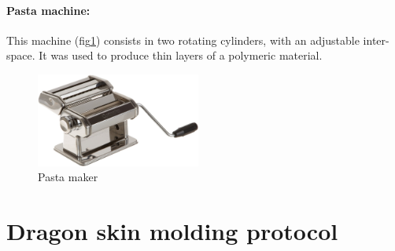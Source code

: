 \paragraph{Pasta machine:}
This machine (fig\ref{fig:pasta_maker}) consists in two rotating cylinders, with an adjustable inter-space. It was used to produce thin layers of a polymeric material.
\begin{figure}[H] %
	\centering%
  \includegraphics[width=0.48\textwidth]{figures/Chapter_1/rolling_machine.png}
	\caption{Pasta maker}
	\label{fig:pasta_maker}
\end{figure}





\section{Dragon skin molding protocol}
